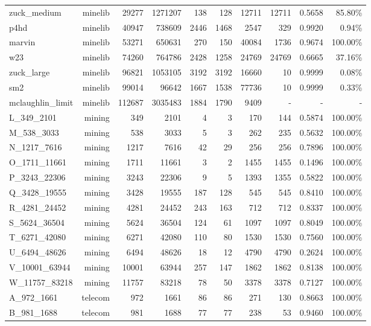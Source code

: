 \begin{longtable}{lrrrrrrrrr}
zuck\_medium & minelib & 29277 & 1271207 & 138 & 128 & 12711 & 12711 & 0.5658 & 85.80\% \\
p4hd & minelib & 40947 & 738609 & 2446 & 1468 & 2547 & 329 & 0.9920 & 0.94\% \\
marvin & minelib & 53271 & 650631 & 270 & 150 & 40084 & 1736 & 0.9674 & 100.00\% \\
w23 & minelib & 74260 & 764786 & 2428 & 1258 & 24769 & 24769 & 0.6665 & 37.16\% \\
zuck\_large & minelib & 96821 & 1053105 & 3192 & 3192 & 16660 & 10 & 0.9999 & 0.08\% \\
sm2 & minelib & 99014 & 96642 & 1667 & 1538 & 77736 & 10 & 0.9999 & 0.33\% \\
mclaughlin\_limit & minelib & 112687 & 3035483 & 1884 & 1790 & 9409 & - & - & - \\
L\_349\_2101 & mining & 349 & 2101 & 4 & 3 & 170 & 144 & 0.5874 & 100.00\% \\
M\_538\_3033 & mining & 538 & 3033 & 5 & 3 & 262 & 235 & 0.5632 & 100.00\% \\
N\_1217\_7616 & mining & 1217 & 7616 & 42 & 29 & 256 & 256 & 0.7896 & 100.00\% \\
O\_1711\_11661 & mining & 1711 & 11661 & 3 & 2 & 1455 & 1455 & 0.1496 & 100.00\% \\
P\_3243\_22306 & mining & 3243 & 22306 & 9 & 5 & 1393 & 1355 & 0.5822 & 100.00\% \\
Q\_3428\_19555 & mining & 3428 & 19555 & 187 & 128 & 545 & 545 & 0.8410 & 100.00\% \\
R\_4281\_24452 & mining & 4281 & 24452 & 243 & 163 & 712 & 712 & 0.8337 & 100.00\% \\
S\_5624\_36504 & mining & 5624 & 36504 & 124 & 61 & 1097 & 1097 & 0.8049 & 100.00\% \\
T\_6271\_42080 & mining & 6271 & 42080 & 110 & 80 & 1530 & 1530 & 0.7560 & 100.00\% \\
U\_6494\_48626 & mining & 6494 & 48626 & 18 & 12 & 4790 & 4790 & 0.2624 & 100.00\% \\
V\_10001\_63944 & mining & 10001 & 63944 & 257 & 147 & 1862 & 1862 & 0.8138 & 100.00\% \\
W\_11757\_83218 & mining & 11757 & 83218 & 78 & 50 & 3378 & 3378 & 0.7127 & 100.00\% \\
A\_972\_1661 & telecom & 972 & 1661 & 86 & 86 & 271 & 130 & 0.8663 & 100.00\% \\
B\_981\_1688 & telecom & 981 & 1688 & 77 & 77 & 238 & 53 & 0.9460 & 100.00\% \\

\end{longtable}
